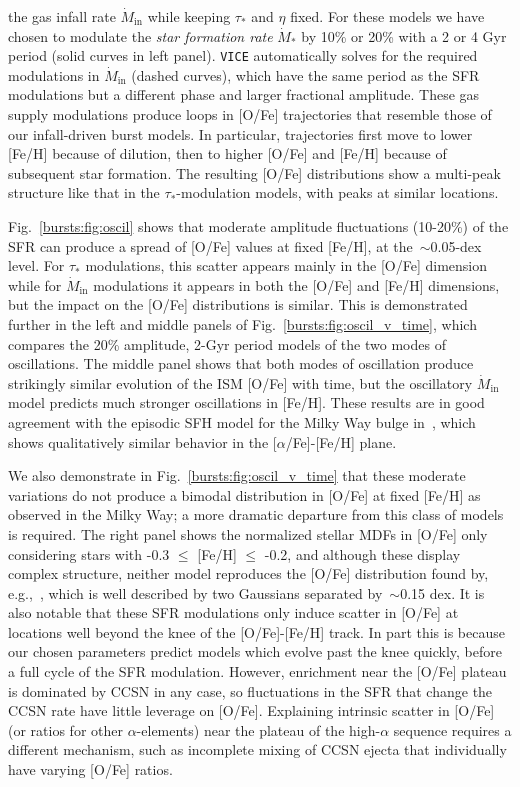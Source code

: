 the gas infall rate $\dot{M}_\text{in}$ while keeping $\tau_*$ and $\eta$ 
fixed. For these models we have chosen to modulate the \textit{star formation 
rate} $\dot{M}_*$ by 10\% or 20\% with a 2 or 4 Gyr period (solid curves in 
left panel). \texttt{VICE} automatically solves for the required modulations in 
$\dot{M}_\text{in}$ (dashed curves), which have the same period as the SFR 
modulations but a different phase and larger fractional amplitude. These gas 
supply modulations produce loops in [O/Fe] trajectories that resemble those of 
our infall-driven burst models. In particular, trajectories first move to lower 
[Fe/H] because of dilution, then to higher [O/Fe] and [Fe/H] because of 
subsequent star formation. The resulting [O/Fe] distributions show a multi-peak 
structure like that in the $\tau_*$-modulation models, with peaks at similar 
locations. 
\par 
Fig.~\ref{bursts:fig:oscil} shows that moderate amplitude fluctuations (10-20\%) of 
the SFR can produce a spread of [O/Fe] values at fixed [Fe/H], at 
the~$\sim$0.05-dex level. For $\tau_*$ modulations, this scatter appears 
mainly in the [O/Fe] dimension while for $\dot{M}_\text{in}$ modulations it 
appears in both the [O/Fe] and [Fe/H] dimensions, but the impact on the [O/Fe] 
distributions is similar. This is demonstrated further in the left and middle 
panels of Fig.~\ref{bursts:fig:oscil_v_time}, which compares the 20\% amplitude, 2-Gyr 
period models of the two modes of oscillations. The middle panel shows that 
both modes of oscillation produce strikingly similar evolution of the ISM 
[O/Fe] with time, but the oscillatory $\dot{M}_\text{in}$ model predicts much 
stronger oscillations in [Fe/H]. 
These results are in good agreement with the episodic SFH model for the 
Milky Way bulge in~\citet{Matteucci2019}, which shows qualitatively similar 
behavior in the [$\alpha$/Fe]-[Fe/H] plane. 
\par 
We also demonstrate in Fig.~\ref{bursts:fig:oscil_v_time} that these moderate 
variations do not produce a bimodal distribution in [O/Fe] at fixed [Fe/H] 
as observed in the Milky Way; a more dramatic departure from this class of 
models is required. The right panel shows the normalized stellar MDFs in [O/Fe] 
only considering stars with -0.3 $\leq$ [Fe/H] $\leq$ -0.2, and although these 
display complex structure, neither model reproduces the [O/Fe] distribution 
found by, e.g.,~\citet{BertranDeLis2016}, which is well described by two 
Gaussians separated by~$\sim$0.15 dex. It is also notable that these SFR 
modulations only induce scatter in [O/Fe] at locations well beyond the knee 
of the [O/Fe]-[Fe/H] track. In part this is because our chosen parameters 
predict models which evolve past the knee quickly, before a full cycle of the 
SFR modulation. However, enrichment near the [O/Fe] plateau is dominated by 
CCSN in any case, so fluctuations in the SFR that change the CCSN rate have 
little leverage on [O/Fe]. Explaining intrinsic scatter in [O/Fe] (or ratios 
for other $\alpha$-elements) near the plateau of the high-$\alpha$ sequence 
requires a different mechanism, such as incomplete mixing of CCSN ejecta that 
individually have varying [O/Fe] ratios. 

